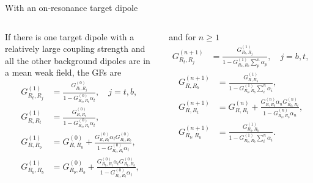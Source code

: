\documentclass{beamer}
\begin{document}
\begin{frame}{With an on-resonance target dipole}
\fontsize{8}{0.2}\selectfont

\begin{columns}
If there is one target dipole with a relatively large coupling strength and all the other background dipoles are in a mean weak field, the GFs are
\begin{subequations}
\begin{align}
 G^{(1)}_{R_t,R_j} &=\frac{G^{(0)}_{R_t,R_j}}{1-G^{(0)}_{R_t,R_t}\alpha_t},\quad j=t,b,\nonumber\\
  G^{(1)}_{R,R_t} &=\frac{G^{(0)}_{R,R_t}}{1-G^{(0)}_{R_t,R_t}\alpha_t}, \nonumber\\
  G^{(1)}_{R,R_b} &=G^{(0)}_{R,R_b}+\frac{G^{(0)}_{R,R_t}\alpha_t G^{(0)}_{R_t,R_b}}{1-G^{(0)}_{R_t,R_t}
  \alpha_t},\nonumber\\
  G^{(1)}_{R_b,R_b} &=G^{(0)}_{R_b,R_b}+\frac{G^{(0)}_{R_b,R_t}\alpha_t G^{(0)}_{R_t,R_b}}{1-G^{(0)}_{R_t,R_t}\alpha_t},\nonumber
\end{align}
\end{subequations}

and for $n\geq 1$
\begin{align}
 G^{(n+1)}_{R_t,R_j} 
&= \frac{G^{(1)}_{R_t,R_j}}{1-G^{(1)}_{R_b,R_b}\sum_p^n{\alpha_p}},\quad j=b,t,\nonumber
\end{align}
\begin{align}
  G^{(n+1)}_{R,R_b} &=\frac{G^{(1)}_{R,R_b}}{1-G^{(1)}_{R_b,R_b}\sum_i^n{\alpha_i}},\nonumber \\
 G^{(n+1)}_{R,R_t} &=G^{(n)}_{R,R_t}+\frac{G^{(n)}_{R,R_b}\alpha_n G^{(n)}_{R_b,R_t}}{1-G^{(n)}_{R_b,R_b}\alpha_n},\nonumber \\
  G^{(n+1)}_{R_b,R_b} &=\frac{G^{(1)}_{R_b,R_b}}{1-G^{(1)}_{R_b,R_b}\sum_i^n{\alpha_i}}.\nonumber
\end{align}
\end{columns}
\end{frame}
\end{document}
